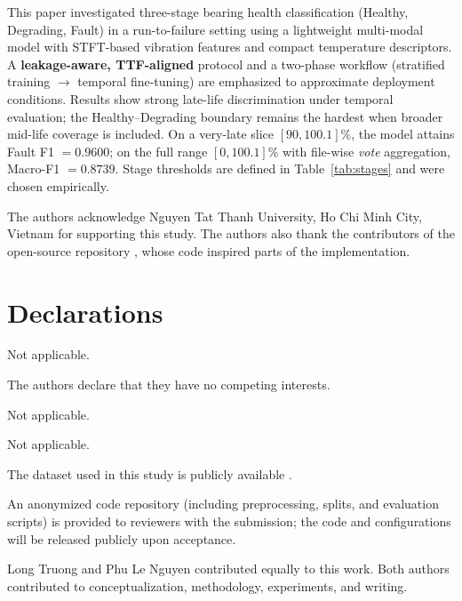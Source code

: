 \documentclass[pdflatex,sn-mathphys-num]{sn-jnl}%
\begin{document}
This paper investigated three-stage bearing health classification (Healthy, Degrading, Fault) in a run-to-failure setting using a lightweight multi-modal model with STFT-based vibration features and compact temperature descriptors. A \textbf{leakage-aware, TTF-aligned} protocol and a two-phase workflow (stratified training $\rightarrow$ temporal fine-tuning) are emphasized to approximate deployment conditions. Results show strong late-life discrimination under temporal evaluation; the Healthy--Degrading boundary remains the hardest when broader mid-life coverage is included. On a very-late slice $[90,100.1]\%$, the model attains Fault F1 $=0.9600$; on the full range $[0,100.1]\%$ with file-wise \emph{vote} aggregation, Macro-F1 $=0.8739$. Stage thresholds are defined in Table~\ref{tab:stages} and were chosen empirically.

The authors acknowledge Nguyen Tat Thanh University, Ho Chi Minh City, Vietnam for supporting this study. The authors also thank the contributors of the open-source repository \cite{mdzalfirdausi_paderborn_repo}, whose code inspired parts of the implementation.

\section*{Declarations}

Not applicable.

The authors declare that they have no competing interests.

Not applicable.

Not applicable.

The dataset used in this study is publicly available \cite{jung2024dib_rtf,jung2024mendeley_rtf}.

An anonymized code repository (including preprocessing, splits, and evaluation scripts) is provided to reviewers with the submission; the code and configurations will be released publicly upon acceptance.

Long Truong and Phu Le Nguyen contributed equally to this work. Both authors contributed to conceptualization, methodology, experiments, and writing.

\begingroup
\sloppy
\small

\endgroup
\end{document}
